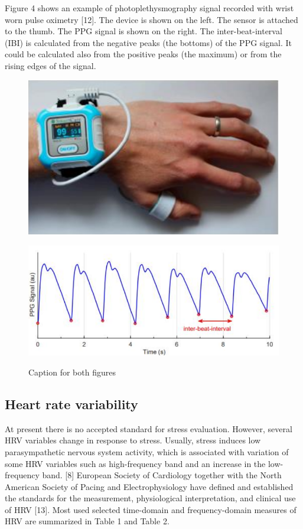 \documentclass{article}
\begin{document}
Figure 4 shows an example of photoplethysmography signal recorded with wrist worn pulse
oximetry [12]. The device is shown on the left. The sensor is attached to the thumb. The
PPG signal is shown on the right. The inter-beat-interval (IBI) is calculated from the negative
peaks (the bottoms) of the PPG signal. It could be calculated also from the positive peaks
(the maximum) or from the rising edges of the signal.


\begin{figure}[h]
\begin{minipage}{0.5\textwidth}
\includegraphics[width=\linewidth]{hand.png}
\label{fig:sub1}
\end{minipage}
\begin{minipage}{0.5\textwidth}
\includegraphics[width=\linewidth]{ppg_signal.png}
\label{fig:sub2}
\end{minipage}
\caption{Caption for both figures}
\label{fig:test}
\end{figure}

\subsection{Heart rate variability}
At present there is no accepted standard for stress evaluation. However, several HRV
variables change in response to stress. Usually, stress induces low parasympathetic
nervous system activity, which is associated with variation of some HRV variables such as
high-frequency band and an increase in the low-frequency band. [8]
European Society of Cardiology together with the North American Society of Pacing and
Electrophysiology have defined and established the standards for the measurement,
physiological interpretation, and clinical use of HRV [13]. Most used selected time-domain
and frequency-domain measures of HRV are summarized in Table 1 and Table 2.
\end{document}
